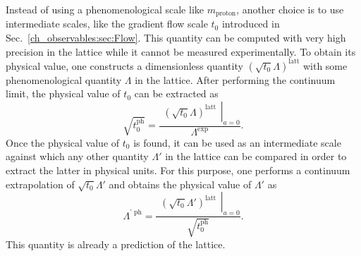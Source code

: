 Instead of using a phenomenological scale like $m_{\textrm{proton}}$, another choice is to use intermediate scales, like the gradient flow scale $t_0$ introduced in Sec.~\ref{ch_observables:sec:Flow}. This quantity can be computed with very high precision in the lattice while it cannot be measured experimentally. To obtain its physical value, one constructs a dimensionless quantity $(\sqrt{t_0}\Lambda)^{\textrm{latt}}$ with some phenomenological quantity $\Lambda$ in the lattice. After performing the continuum limit, the physical value of $t_0$ can be extracted as
\begin{equation}
\sqrt{t_0^{\textrm{ph}}}=\frac{\left.\begin{matrix}
\left(\sqrt{t_0}\Lambda\right)^{\textrm{latt}}
\end{matrix}\right|_{a=0}}{\Lambda^{\textrm{exp}}}.
\end{equation}
Once the physical value of $t_0$ is found, it can be used as an intermediate scale against which any other quantity $\Lambda'$ in the lattice can be compared in order to extract the latter in physical units. For this purpose, one performs a continuum extrapolation of $\sqrt{t_0}\Lambda'$ and obtains the physical value of $\Lambda'$ as
\begin{equation}
\Lambda^{\textrm{' ph}}=\frac{\left.\begin{matrix}
\left(\sqrt{t_0}\Lambda'\right)^{\textrm{latt}}
\end{matrix}\right|_{a=0}}{\sqrt{t_0^{\textrm{ph}}}}.
\end{equation}
This quantity is already a prediction of the lattice.

